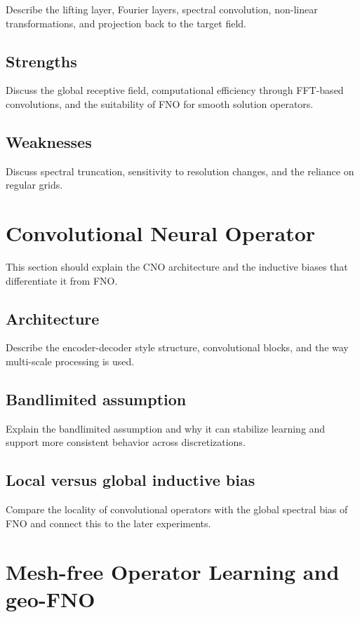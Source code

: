 Describe the lifting layer, Fourier layers, spectral convolution,
non-linear transformations, and projection back to the target field.

\subsection{Strengths}

Discuss the global receptive field, computational efficiency through
FFT-based convolutions, and the suitability of FNO for smooth
solution operators.

\subsection{Weaknesses}

Discuss spectral truncation, sensitivity to resolution changes, and
the reliance on regular grids.

\section{Convolutional Neural Operator}

This section should explain the CNO architecture and the inductive
biases that differentiate it from FNO.

\subsection{Architecture}

Describe the encoder-decoder style structure, convolutional blocks, and
the way multi-scale processing is used.

\subsection{Bandlimited assumption}

Explain the bandlimited assumption and why it can stabilize learning and
support more consistent behavior across discretizations.

\subsection{Local versus global inductive bias}

Compare the locality of convolutional operators with the global spectral
bias of FNO and connect this to the later experiments.

\section{Mesh-free Operator Learning and geo-FNO}

